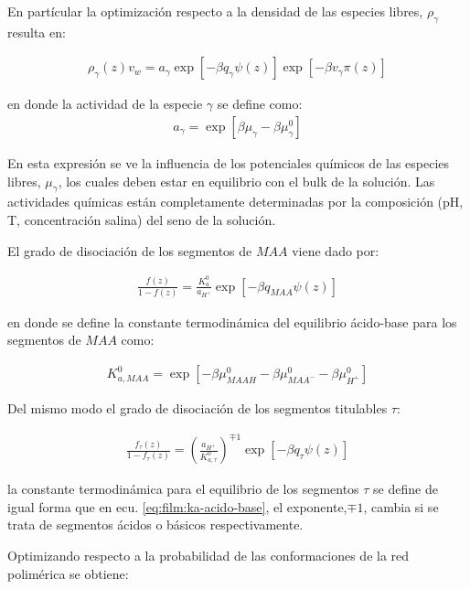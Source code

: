 En part\'icular la optimizaci\'on respecto a la densidad de las especies libres, $\rho_\gamma$ resulta en:

\begin{align}
	\rho_\gamma(z)v_w = a_\gamma \exp\left[-\beta q_\gamma\psi(z)\right] \exp\left[-\beta v_\gamma\pi(z)\right]
	\label{eq:film:free-species}
\end{align}

\noindent en donde la actividad de la especie $\gamma$ se define como:
\begin{align}
	a_\gamma = \exp[\beta\mu_\gamma - \beta\mu^0_\gamma]
\end{align}

En esta expresi\'on se ve la influencia de los potenciales qu\'imicos de las especies libres,  $\mu_\gamma$, los cuales  deben estar en equilibrio con el bulk de la soluci\'on. Las actividades qu\'imicas est\'an completamente determinadas por la composici\'on (pH, T, concentraci\'on salina) del seno de la soluci\'on.
 
El grado de disociaci\'on de los segmentos de $MAA$ viene dado por:

\begin{align}
	\frac{f(z)}{1-f(z)} = \frac{K^0_a}{a_{H^+}} \exp[-\beta q_{MAA}\psi(z)]
	\label{eq:film:degree-film}
\end{align}

\noindent en donde se define la constante termodin\'amica del equilibrio \'acido-base para los segmentos de $MAA$ como:

\begin{align}
	K_{a,MAA}^0 = \exp[-\beta\mu^0_{MAAH} -\beta\mu^0_{MAA^-} -\beta\mu^0_{H^+}]
	\label{eq:film:ka-acido-base}
\end{align}

Del mismo modo el grado de disociaci\'on de los segmentos titulables $\tau$:

\begin{align}
	\frac{f_\tau(z)}{1-f_\tau(z)} = \left(\frac{a_{H^+}}{K^0_{a,\tau}}\right)^{\mp 1} \exp[-\beta q_\tau \psi(z)]
	\label{eq:film:degree-protein}
\end{align}


\noindent la constante termodin\'amica para el equilibrio de los segmentos $\tau$ se define de igual forma que en ecu. \ref{eq:film:ka-acido-base}, el exponente,$\mp 1$, cambia si se trata de segmentos \'acidos o b\'asicos respectivamente.

Optimizando respecto a la probabilidad de las conformaciones de la red polim\'erica se obtiene:

